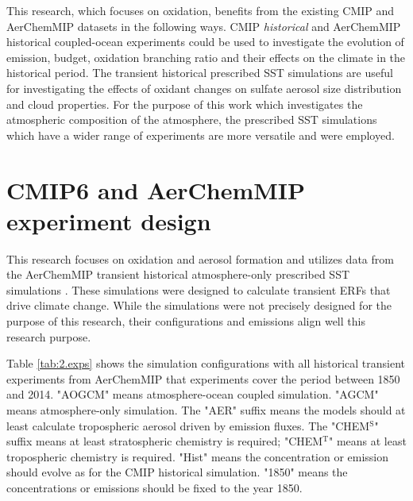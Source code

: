 This research, which focuses on  oxidation, benefits from the existing CMIP and AerChemMIP datasets in the following ways. CMIP \textit{historical} and AerChemMIP historical coupled-ocean experiments could be used to investigate the evolution of  emission, budget, oxidation branching ratio and their effects on the climate in the historical period. The transient historical prescribed SST simulations are useful for investigating the effects of oxidant changes on sulfate aerosol size distribution and cloud properties.  For the purpose of this work which investigates the atmospheric composition of the atmosphere, the prescribed SST simulations which have a wider range of experiments are more versatile and were employed.



\section{CMIP6 and AerChemMIP experiment design}

This research focuses on  oxidation and aerosol formation and utilizes data from the AerChemMIP transient historical atmosphere-only prescribed SST simulations \citep{collinsAerChemMIPQuantifyingEffects2017}. These simulations were designed to calculate transient ERFs that drive climate change.  While the simulations were not precisely designed for the purpose of this research, their configurations and emissions align well this research purpose.


Table \ref{tab:2.exps} shows the simulation configurations with all historical transient experiments from AerChemMIP that experiments cover the period between 1850 and 2014. "AOGCM" means atmosphere-ocean coupled simulation. "AGCM" means atmosphere-only simulation. The "AER" suffix means the models should at least calculate tropospheric aerosol driven by emission fluxes. The "CHEM$^\text{S}$" suffix means at least stratospheric chemistry is required; "CHEM$^\text{T}$" means at least tropospheric chemistry is required. "Hist" means the concentration or emission should evolve as for the CMIP historical simulation. "1850" means the concentrations or emissions should be fixed to the year 1850. 

